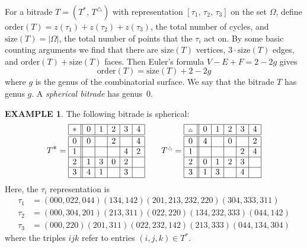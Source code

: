 \documentclass[12pt,amstags,fleqn]{article}
\theoremstyle{plain}
\theoremstyle{definition}
\theoremstyle{definition}
\newtheorem{example}[theorem]{EXAMPLE}
\newcommand{\mov}{\textnormal{Mov}}
\newcommand{\darts}{\Omega}
\def\ll{{\textstyle \ast}}
\def\rr{{\scriptscriptstyle \triangle}}
\newcommand{\opa}{\ll}
\newcommand{\opb}{\rr}
\begin{document}
For a bitrade $T = (T^{\opa},\, T^{\opb})$ with representation 
$[\tau_1,\, \tau_2,\, \tau_3]$
on the set $\darts$,
define
$\text{order}(T)  = z(\tau_1) + z(\tau_2) + z(\tau_3)$, the total number
of cycles, and
$\text{size}(T) = \left| \darts \right|$, the total number of points 
that the $\tau_i$ act on. 
By some basic counting arguments we find that there are 
$\text{size}(T)$ vertices, $3 \cdot \text{size}(T)$ edges, and 
$\text{order}(T) + \text{size}(T)$ faces. Then Euler's formula
$V-E+F=2-2g$ gives
\begin{equation}\label{eqnDrapalGenus}
\text{order}(T) = \text{size}(T) + 2 - 2g
\end{equation}
where $g$ is the genus of the combinatorial surface. We say that
the bitrade $T$ has genus $g$.
A {\em spherical bitrade} has genus~$0$.

\begin{example}\label{exspherical}
The following bitrade is spherical:
\begin{align*}
T^{\opa} = 
\begin{array}{|c||c|c|c|c|c|}
\hline
\opa & 0 & 1 & 2 & 3 & 4\\
\hline
 \hline 0 & 0 & ~ & 2 & ~ & 4\\
 \hline 1 & ~ & ~ & ~ & 4 & 2\\
 \hline 2 & 1 & 3 & 0 & 2 & ~\\
 \hline 3 & 4 & 1 & ~ & 3 & ~\\
\hline
\end{array}
& \quad & 
T^{\opb} = 
\begin{array}{|c||c|c|c|c|c|}
\hline
\opb & 0 & 1 & 2 & 3 & 4\\
\hline
 \hline 0 & 4 & ~ & 0 & ~ & 2\\
 \hline 1 & ~ & ~ & ~ & 2 & 4\\
 \hline 2 & 0 & 1 & 2 & 3 & ~\\
 \hline 3 & 1 & 3 & ~ & 4 & ~\\ 
\hline
\end{array}
\end{align*}
Here, the $\tau_i$ representation is
\begin{align*}
\tau_1 &= (000, 022, 044)(134, 142) (201,213,232,220) (304,333,311) \\
\tau_2 &= (000,304,201)(213,311)(022,220)(134,232,333)(044,142) \\
\tau_3 &= (000,220)(201,311)(022,232,142)(213,333)(044,134,304)
\end{align*}
where the triples $ijk$ refer to entries $(i,j,k) \in T^{\opa}$.
\end{example}
\end{document}
